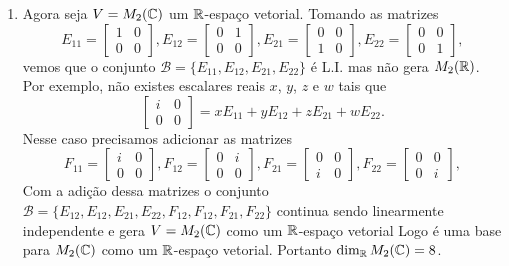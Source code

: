 \begin{exemplos}
\begin{enumerate}
		\item Agora seja $V = M_2(\mathbb{C})$ um $\mathbb{R}$-espaço vetorial. Tomando as matrizes
			\[
				E_{11} = \begin{bmatrix}1 & 0\\0 & 0\end{bmatrix},
				E_{12} = \begin{bmatrix}0 & 1\\0 & 0\end{bmatrix},
				E_{21} = \begin{bmatrix}0 & 0\\1 & 0\end{bmatrix},
				E_{22} = \begin{bmatrix}0 & 0\\0 & 1\end{bmatrix},
			\]
			vemos que o conjunto $\mathcal{B} = \{E_{11}, E_{12}, E_{21}, E_{22}\}$ é L.I. mas não gera $M_2(\mathbb{R})$. Por exemplo, não existes escalares reais $x$, $y$, $z$ e $w$ tais que
			\[
				\begin{bmatrix}i & 0 \\0 & 0\end{bmatrix} = xE_{11} + yE_{12} + zE_{21} + wE_{22}.
			\]
			Nesse caso precisamos adicionar as matrizes
			\[
				F_{11} = \begin{bmatrix}i & 0\\0 & 0\end{bmatrix},
				F_{12} = \begin{bmatrix}0 & i\\0 & 0\end{bmatrix},
				F_{21} = \begin{bmatrix}0 & 0\\i & 0\end{bmatrix},
				F_{22} = \begin{bmatrix}0 & 0\\0 & i\end{bmatrix},
			\]
			Com a adição dessa matrizes o conjunto $\mathcal{B} = \{E_{12}, E_{12}, E_{21}, E_{22}, F_{12}, F_{12}, F_{21}, F_{22}\}$ continua sendo linearmente independente e gera $V = M_2(\mathbb{C})$
			como um $\mathbb{R}$-espaço vetorial Logo é uma base para $M_2(\mathbb{C})$ como um $\mathbb{R}$-espaço vetorial. Portanto $\dim_{\mathbb{R}} M_2(\mathbb{C}) = 8$.


\end{enumerate}
\end{exemplos}
